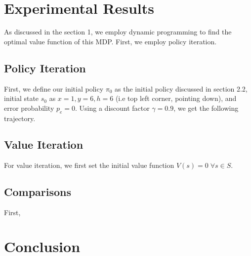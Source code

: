 \documentclass[fullpage]{article}
\begin{document}
\section{Experimental Results}

As discussed in the section 1, we employ dynamic programming to find the optimal value function of this MDP. First, we employ policy iteration.

\subsection{Policy Iteration}

First, we define our initial policy $\pi_0$ as the initial policy discussed in section 2.2, initial state $s_0$ as $x = 1, y = 6, h = 6$ (i.e top left corner, pointing down), and error probability $p_e = 0$. Using a discount factor $\gamma = 0.9$, we get the following trajectory.

\subsection{Value Iteration}

For value iteration, we first set the initial value function $V(s) = 0\; \forall s \in S$.

\subsection{Comparisons}
First, 


\section{Conclusion}
\end{document}
